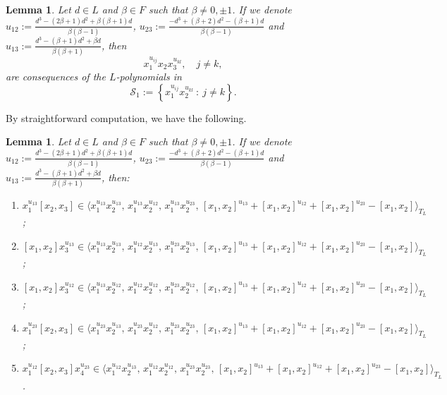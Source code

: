 \documentclass[a4paper,reqno]{amsart}
\newtheorem{lemma}[theorem]{Lemma}
\theoremstyle{definition}
\numberwithin{equation}{section}
\numberwithin{theorem}{section}
\begin{document}
\begin{lemma}\label{lem: UT_3^e1+be2 cons var in the mid}
     Let $d\in L$ and $\beta\in F$ such that $\beta\neq 0, \pm 1$. If we denote $u_{12}:=\frac{d^3- (2\beta+1)d^2+\beta(\beta+1)d}{\beta(\beta-1)}$, $u_{23}:=\frac{-d^3+(\beta+2)d^2-(\beta+1)d}{\beta(\beta-1)}$ and $u_{13}:=\frac{d^3-(\beta+1)d^2+\beta d}{\beta(\beta+1)}$, then
     $$
     x_1^{u_{ij}} x_2 x_3^{u_{kl}}, \quad  j\neq k,
     $$ 
     are consequences of the $L$-polynomials in
$$\mathcal{S}_1:=\left\{  x_1^{u_{ij}}x_2^{u_{kl}}\ : \ j\neq k \right\}.$$
\end{lemma}

By straightforward computation, we have the following.
\begin{lemma}\label{lem:  UT_3^e1+be2 u_ij com}
     Let $d\in L$ and $\beta\in F$ such that $\beta\neq 0, \pm 1$. If we denote $u_{12}:=\frac{d^3- (2\beta+1)d^2+\beta(\beta+1)d}{\beta(\beta-1)}$, $u_{23}:=\frac{-d^3+(\beta+2)d^2-(\beta+1)d}{\beta(\beta-1)}$ and $u_{13}:=\frac{d^3-(\beta+1)d^2+\beta d}{\beta(\beta+1)}$, then:
     \begin{enumerate}
         \item $ x_1^{u_{13}} [x_2,x_3] \in \langle x_1^{u_{13}} x_2^{u_{13}} , \, x_1^{u_{13}} x_2^{u_{12}} , \, x_1^{u_{13}} x_2^{u_{23}}, \,  [x_1,x_2]^{u_{13}}+ [x_1,x_2]^{u_{12}} + [x_1,x_2]^{u_{23}} - [x_1,x_2] \rangle_{T_L}$;
          \vspace{1mm}
         \item $[x_1,x_2] x_3^{u_{13}} \in \langle x_1^{u_{13}} x_2^{u_{13}} , \, x_1^{u_{12}} x_2^{u_{13}} , \, x_1^{u_{23}} x_2^{u_{13}}, \,  [x_1,x_2]^{u_{13}}+ [x_1,x_2]^{u_{12}} + [x_1,x_2]^{u_{23}} - [x_1,x_2] \rangle_{T_L}$;
         \vspace{1mm}
         \item $[x_1,x_2] x_3^{u_{12}} \in \langle x_1^{u_{13}} x_2^{u_{12}} , \, x_1^{u_{12}} x_2^{u_{12}} , \, x_1^{u_{23}} x_2^{u_{12}}, \,  [x_1,x_2]^{u_{13}}+ [x_1,x_2]^{u_{12}} + [x_1,x_2]^{u_{23}} - [x_1,x_2] \rangle_{T_L}$;
         \vspace{1mm}
         \item $ x_1^{u_{23}} [x_2,x_3] \in \langle x_1^{u_{23}} x_2^{u_{13}} , \, x_1^{u_{23}} x_2^{u_{12}} , \, x_1^{u_{23}} x_2^{u_{23}}, \,  [x_1,x_2]^{u_{13}}+ [x_1,x_2]^{u_{12}} + [x_1,x_2]^{u_{23}} - [x_1,x_2] \rangle_{T_L}$;
          \vspace{1mm}
         \item $x_1^{u_{12}} [x_2,x_3] x_4^{u_{23}} \in \langle x_1^{u_{12}} x_2^{u_{13}} , \, x_1^{u_{12}} x_2^{u_{12}} , \, x_1^{u_{23}} x_2^{u_{23}}, \,  [x_1,x_2]^{u_{13}}+ [x_1,x_2]^{u_{12}} + [x_1,x_2]^{u_{23}} - [x_1,x_2] \rangle_{T_L}$.
     \end{enumerate}
\end{lemma}
\end{document}
